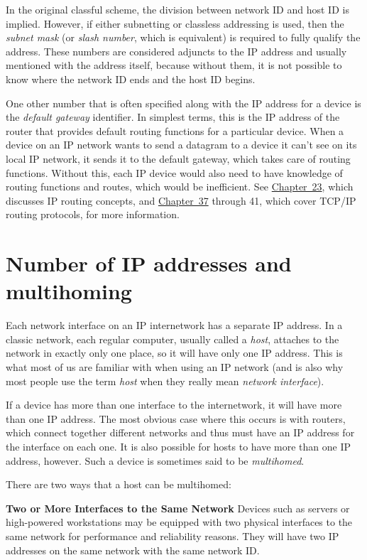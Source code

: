 In the original classful scheme, the division between network ID and host ID is
implied.
However, if either subnetting or classless addressing is used, then the {\emph{subnet mask}} (or {\emph{slash number}}, which is equivalent) is required to fully qualify the address.
These numbers are considered adjuncts to the IP address and usually mentioned with the address itself, because without them, it is not possible to know where the network ID ends and the host ID begins.

One other number that is often specified along with the IP address for a
device is the
\protect\hypertarget{ch16s04.htmlux5cux23idx-CHP-16-0666}{}{}{\emph{default
gateway}} identifier. In simplest terms, this is the IP address of the
router that provides default routing functions for a particular device.
When a device on an IP network wants to send a datagram to a device it
can't see on its local IP network, it sends it to the default gateway,
which takes care of routing functions. Without this, each IP device
would also need to have knowledge of routing functions and routes, which
would be inefficient. See \protect\hyperlink{ch23.html}{Chapter~23},
which discusses IP routing concepts, and
\protect\hyperlink{ch37.html}{Chapter~37} through 41, which cover TCP/IP
routing protocols, for more information.


\section{Number of IP addresses and multihoming}
Each network interface on an IP internetwork has a separate IP address.
In a classic network, each regular computer, usually called a
{\emph{host}}, attaches to the network in exactly only one place, so it
will have only one IP address. This is what most of us are familiar with
when using an IP network (and is also why most people use the term
{\emph{host}} when they really mean {\emph{network interface}}).

If a device has more than one interface to the internetwork, it will
have more than one IP address. The most obvious case where this occurs
is with routers, which connect together different networks and thus must
have an IP address for the interface on each one. It is also possible
for hosts to have more than one IP address, however. Such a device is
sometimes said to be {\emph{multihomed}}.

There are two ways that a host can be multihomed:

{\textbf{Two or More Interfaces to the Same Network}} Devices such as
servers or high-powered workstations may be equipped with two physical
interfaces to the same network for performance and reliability reasons.
They will have two IP addresses on the same network with the same
network ID.

